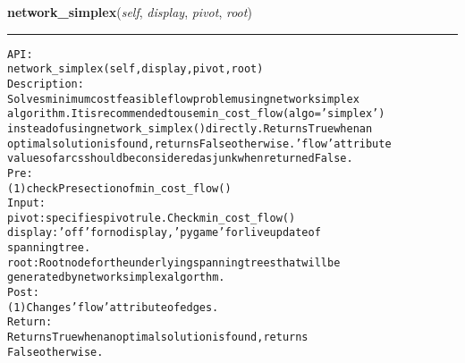     \label{coinor:gimpy:graph:Graph:network_simplex}

    \vspace{0.5ex}

\hspace{.8\funcindent}\begin{boxedminipage}{\funcwidth}

    \raggedright \textbf{network\_simplex}(\textit{self}, \textit{display}, \textit{pivot}, \textit{root})

    \vspace{-1.5ex}

    \rule{\textwidth}{0.5\fboxrule}
\setlength{\parskip}{2ex}
\begin{alltt}

API:
    network\_simplex(self, display, pivot, root)
Description:
    Solves minimum cost feasible flow problem using network simplex
    algorithm. It is recommended to use min\_cost\_flow(algo='simplex')
    instead of using network\_simplex() directly. Returns True when an
    optimal solution is found, returns False otherwise. 'flow' attribute
    values of arcs should be considered as junk when returned False.
Pre:
    (1) check Pre section of min\_cost\_flow()
Input:
    pivot: specifies pivot rule. Check min\_cost\_flow()
    display: 'off' for no display, 'pygame' for live update of
    spanning tree.
    root: Root node for the underlying spanning trees that will be
    generated by network simplex algorthm.
Post:
    (1) Changes 'flow' attribute of edges.
Return:
    Returns True when an optimal solution is found, returns
    False otherwise.
\end{alltt}

\setlength{\parskip}{1ex}
    \end{boxedminipage}

    \label{coinor:gimpy:graph:Graph:simplex_mark_leaving_arc}

    \vspace{0.5ex}

